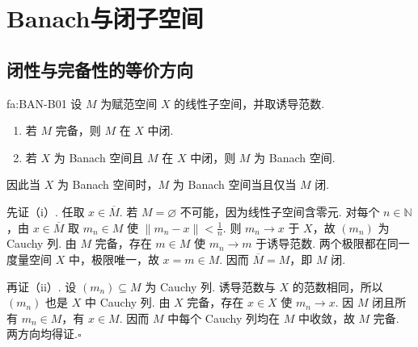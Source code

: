 \section{Banach与闭子空间}\label{sec:i03-closed-subspaces}

\subsection{闭性与完备性的等价方向}

\begin{FATheorem}[B][闭子空间与完备性]{fa:BAN-B01}
设 \(\displaystyle M\) 为赋范空间 \(\displaystyle X\) 的线性子空间，并取诱导范数.
\begin{enumerate}[label=\textup{(\roman*)}]
\item 若 \(\displaystyle M\) 完备，则 \(\displaystyle M\) 在 \(\displaystyle X\) 中闭.
\item 若 \(\displaystyle X\) 为 Banach 空间且 \(\displaystyle M\) 在 \(\displaystyle X\) 中闭，则 \(\displaystyle M\) 为 Banach 空间.
\end{enumerate}
因此当 \(\displaystyle X\) 为 Banach 空间时，\(\displaystyle M\) 为 Banach 空间当且仅当 \(\displaystyle M\) 闭.
\end{FATheorem}

\begin{FAProof}
先证（i）. 任取 \(\displaystyle x\in\overline M\). 若 \(\displaystyle M=\varnothing\) 不可能，因为线性子空间含零元. 对每个 \(\displaystyle n\in\mathbb N\)，由 \(\displaystyle x\in\overline M\) 取 \(\displaystyle m_n\in M\) 使 \(\displaystyle \|m_n-x\|<\frac{1}{n}\). 则 \(\displaystyle m_n\to x\) 于 \(\displaystyle X\)，故 \(\displaystyle (m_n)\) 为 Cauchy 列. 由 \(\displaystyle M\) 完备，存在 \(\displaystyle m\in M\) 使 \(\displaystyle m_n\to m\) 于诱导范数. 两个极限都在同一度量空间 \(\displaystyle X\) 中，极限唯一，故 \(\displaystyle x=m\in M\). 因而 \(\displaystyle \overline M=M\)，即 \(\displaystyle M\) 闭.

再证（ii）. 设 \(\displaystyle (m_n)\subseteq M\) 为 Cauchy 列. 诱导范数与 \(\displaystyle X\) 的范数相同，所以 \(\displaystyle (m_n)\) 也是 \(\displaystyle X\) 中 Cauchy 列. 由 \(\displaystyle X\) 完备，存在 \(\displaystyle x\in X\) 使 \(\displaystyle m_n\to x\). 因 \(\displaystyle M\) 闭且所有 \(\displaystyle m_n\in M\)，有 \(\displaystyle x\in M\). 因而 \(\displaystyle M\) 中每个 Cauchy 列均在 \(\displaystyle M\) 中收敛，故 \(\displaystyle M\) 完备. 两方向均得证.\hfill\(\square\)
\end{FAProof}

